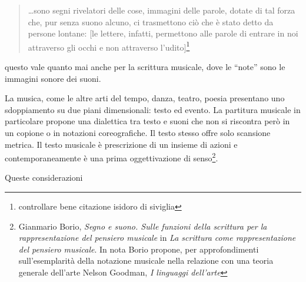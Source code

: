 \begin{quote}
	\ldots sono segni rivelatori delle cose, immagini delle parole, dotate di tal
	forza che, pur senza suono alcuno, ci trasmettono ciò che è stato detto da
	persone lontane: [le lettere, infatti, permettono alle parole di entrare in noi
	attraverso gli occhi e non attraverso l'udito]\footnote{controllare bene citazione isidoro di siviglia}
\end{quote}

questo vale quanto mai anche per la scrittura musicale, dove le “note” sono le immagini sonore dei suoni.


La musica, come le altre arti del tempo, danza, teatro, poesia presentano uno sdoppiamento su due piani dimensionali: testo ed evento.
La partitura musicale in particolare propone una dialettica tra testo e suoni che non si riscontra però in un copione o in notazioni coreografiche. Il testo stesso offre solo scansione metrica. Il testo musicale è prescrizione di un insieme di azioni e contemporaneamente è una prima oggettivazione di senso\footnote{Gianmario Borio, \emph{Segno e suono. Sulle funzioni della scrittura per la rappresentazione del pensiero musicale} in \emph{La scrittura come rappresentazione del pensiero musicale}. In nota Borio propone, per approfondimenti sull'esemplarità della notazione musicale nella relazione con una teoria generale dell'arte Nelson Goodman, \emph{I linguaggi dell'arte}}.

Queste considerazioni


%
